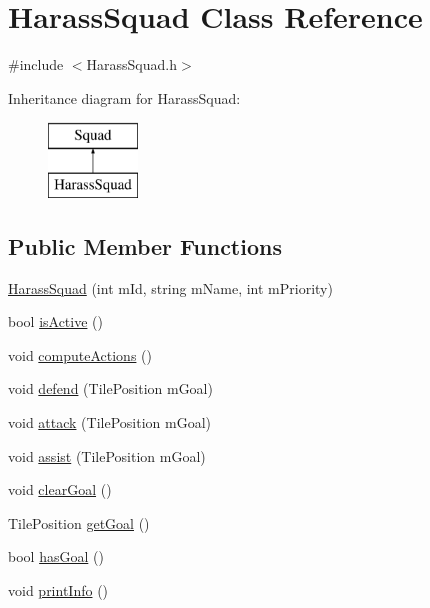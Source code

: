 \hypertarget{class_harass_squad}{
\section{HarassSquad Class Reference}
\label{class_harass_squad}
}


{\ttfamily \#include $<$HarassSquad.h$>$}

Inheritance diagram for HarassSquad:\begin{figure}[H]
\begin{center}
\leavevmode
\includegraphics[height=2.000000cm]{class_harass_squad}
\end{center}
\end{figure}
\subsection*{Public Member Functions}
\begin{DoxyCompactItemize}
\item 
\hyperlink{class_harass_squad_a9704b2165d838caa755813c4e91471ca}{HarassSquad} (int mId, string mName, int mPriority)
\item 
bool \hyperlink{class_harass_squad_a3cd7f4900e147db9e78fb3509032dfb3}{isActive} ()
\item 
void \hyperlink{class_harass_squad_ad1cb0d9361b394b90ecf8d52adaac216}{computeActions} ()
\item 
void \hyperlink{class_harass_squad_a84294bbf1a64413e5c69d61a287e20e3}{defend} (TilePosition mGoal)
\item 
void \hyperlink{class_harass_squad_a40e90077490c35bc49f9c761d75c9925}{attack} (TilePosition mGoal)
\item 
void \hyperlink{class_harass_squad_a6419cb1b53d7997c42d41e0ef805d2dc}{assist} (TilePosition mGoal)
\item 
void \hyperlink{class_harass_squad_a04a289635a3f3c7e345a5cb424b2a603}{clearGoal} ()
\item 
TilePosition \hyperlink{class_harass_squad_a0013e56c21bc2bea1a55f7c5efb4171e}{getGoal} ()
\item 
bool \hyperlink{class_harass_squad_a72fe91a440b7df1e09d4e85479c9c3ab}{hasGoal} ()
\item 
void \hyperlink{class_harass_squad_a796e444b36f2ef102fe08ca459b0dcc1}{printInfo} ()
\end{DoxyCompactItemize}


